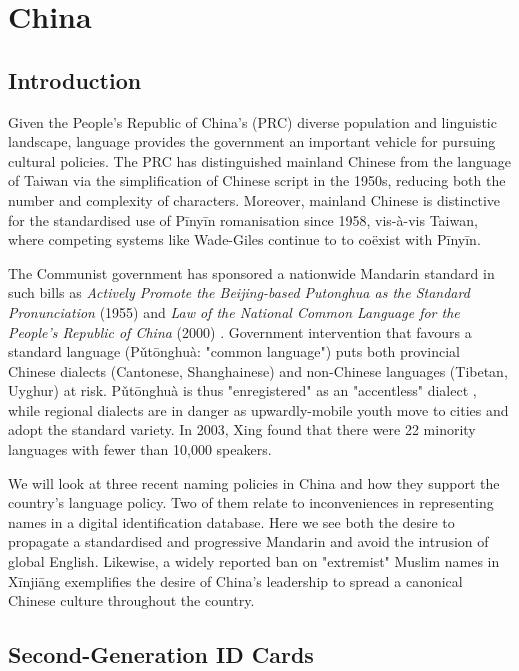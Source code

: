 \section{China}

\subsection{Introduction}

Given the People's Republic of China's (PRC) diverse population and linguistic
landscape, language provides the government an important vehicle for pursuing
cultural policies. The PRC has distinguished mainland Chinese from the language
of Taiwan via the simplification of Chinese script in the 1950s, reducing both
the number and complexity of characters. Moreover, mainland Chinese is
distinctive for the standardised use of Pīnyīn romanisation since 1958,
vis-à-vis Taiwan, where competing systems like Wade-Giles continue to to coëxist
with Pīnyīn. 

The Communist government has sponsored a nationwide Mandarin standard in such
bills as \textit{Actively Promote the Beijing-based Putonghua as the Standard
Pronunciation} (1955) and \textit{Law of the National Common Language for the
People’s Republic of China} (2000) \parencite{dong10}. Government intervention
that favours a standard language (Pǔtōnghuà: "common language") puts both
provincial Chinese dialects (Cantonese, Shanghainese) and non-Chinese languages
(Tibetan, Uyghur) at risk. Pǔtōnghuà is thus "enregistered" as an "accentless"
dialect \parencite{dong10}, while regional dialects are in danger as
upwardly-mobile youth move to cities and adopt the standard variety. In 2003,
Xing found that there were 22 minority languages with fewer than 10,000
speakers.

We will look at three recent naming policies in China and how they support the
country's language policy. Two of them relate to inconveniences in representing
names in a digital identification database. Here we see both the desire to
propagate a standardised and progressive Mandarin and avoid the intrusion of
global English. Likewise, a widely reported ban on "extremist" Muslim names in
Xīnjiāng exemplifies the desire of China's leadership to spread a canonical
Chinese culture throughout the country.

\subsection{Second-Generation ID Cards}

